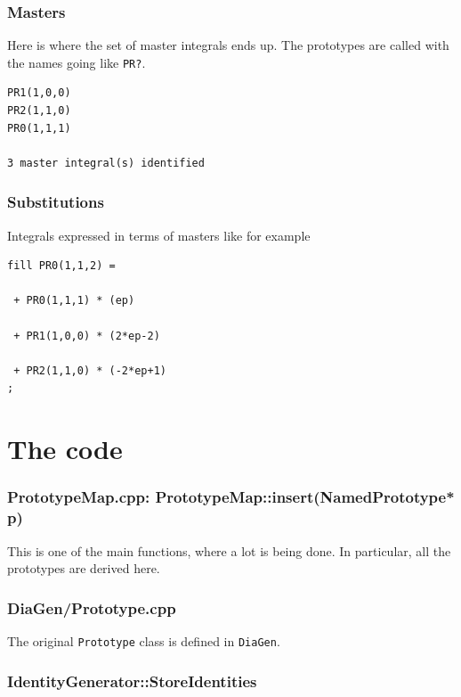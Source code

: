 \documentclass[a4paper,11pt]{article}
\begin{document}
\subsubsection*{Masters}

Here is where the set of master integrals ends up. The prototypes are called
with the names going like \verb+PR?+.

\begin{lstlisting}[label=test-Masters, caption=Masters]
PR1(1,0,0)
PR2(1,1,0)
PR0(1,1,1)

3 master integral(s) identified
\end{lstlisting}

\subsubsection*{Substitutions}

Integrals expressed in terms of masters like for example
%
\begin{lstlisting}[label=test-Substitutions, caption=Substitutions]
fill PR0(1,1,2) =

 + PR0(1,1,1) * (ep)

 + PR1(1,0,0) * (2*ep-2)

 + PR2(1,1,0) * (-2*ep+1)
;

\end{lstlisting}

\section{The code}

\subsubsection*{PrototypeMap.cpp: PrototypeMap::insert(NamedPrototype* p)}

This is one of the main functions, where a lot is being done. In particular, all
the prototypes are derived here.

\subsubsection*{DiaGen/Prototype.cpp}

The original \verb+Prototype+ class is defined in \verb+DiaGen+.

\subsubsection*{IdentityGenerator::StoreIdentities}
\end{document}

